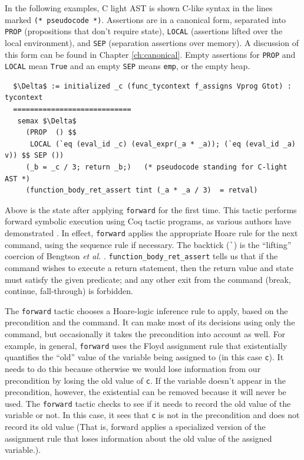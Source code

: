 \documentclass{puthesis}
\begin{document}
In the following examples, C light AST is shown C-like syntax
in the lines marked \lstinline|(* pseudocode *)|. Assertions are in a
canonical form, separated into \lstinline|PROP| (propositions that
don't require state), \lstinline|LOCAL| (assertions lifted over the
local environment), and \lstinline|SEP| (separation assertions over
memory). A discussion of this form can
be found in Chapter \ref{ch:canonical}. Empty assertions for
\lstinline|PROP| and \lstinline|LOCAL| mean \lstinline|True| and an
empty \lstinline|SEP| means \lstinline|emp|, or the empty heap.

\begin{lstlisting}
  $\Delta$ := initialized _c (func_tycontext f_assigns Vprog Gtot) : tycontext
  ============================
   semax $\Delta$  
     (PROP  () $$ 
      LOCAL (`eq (eval_id _c) (eval_expr(_a * _a)); (`eq (eval_id _a) v)) $$ SEP ()) 
     (_b = _c / 3; return _b;)   (* pseudocode standing for C-light AST *) 
     (function_body_ret_assert tint (_a * _a / 3)  = retval)
\end{lstlisting}

Above is the state after applying \lstinline|forward| for the first
time.  This tactic performs forward symbolic execution using Coq
tactic programs, as various authors have demonstrated
\cite{appel06:listmachine,chlipala11:pldi,bengtson12:Charge,mccreight09}. In
effect, \lstinline|forward| applies the appropriate Hoare rule for the
next command, using the sequence rule if necessary. The backtick
(\lstinline|`|) is the ``lifting'' coercion of Bengtson \emph{et al.}
\cite{bengtson12:Charge}.  \lstinline|function_body_ret_assert| tells
us that if the command wishes to execute a return statement, then the
return value and state must satisfy the given predicate; and any other
exit from the command (break, continue, fall-through) is forbidden.

The \lstinline|forward| tactic chooses a Hoare-logic inference rule to
apply, based on the precondition and the command. It can make most of
its decisions using only the command, but occasionally it takes the
precondition into account as well. For example, in general,
\lstinline|forward| uses the Floyd assignment rule that existentially
quantifies the ``old'' value of the variable being assigned to (in
this case \lstinline|c|). It needs to do this because otherwise we
would lose information from our precondition by losing the old value
of \lstinline|c|. If the variable doesn't appear in the precondition,
however, the existential can be removed because it will never be
used. The \lstinline|forward| tactic checks to see if it needs to
record the old value of the variable or not. In this case, it sees
that \lstinline|c| is not in the precondition and does not record its
old value (That is, forward applies a specialized version of the
assignment rule that loses information about the old value of the
assigned variable.).
\end{document}
